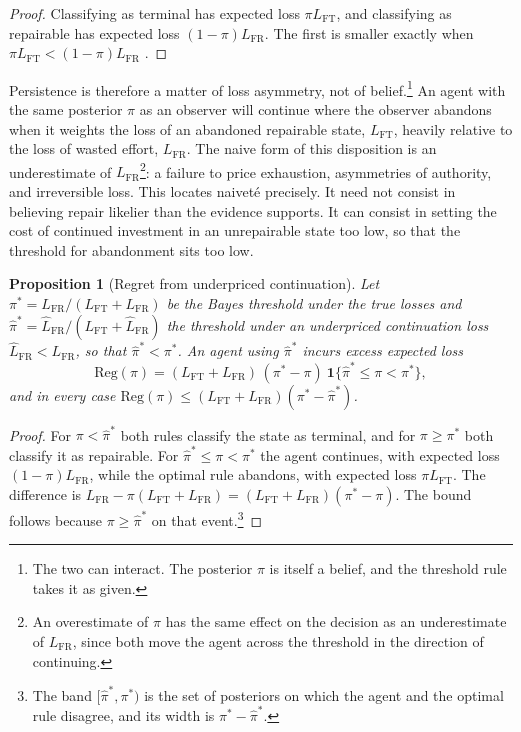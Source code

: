 \documentclass[11pt]{article}
\newtheorem{proposition}{Proposition}
\theoremstyle{remark}
\begin{document}
\begin{proof}
Classifying as terminal has expected loss $\pi L_{\mathrm{FT}}$, and classifying as repairable has expected loss $(1-\pi)L_{\mathrm{FR}}$. The first is smaller exactly when $\pi L_{\mathrm{FT}}<(1-\pi)L_{\mathrm{FR}}$ \cite{berger}.
\end{proof}

Persistence is therefore a matter of loss asymmetry, not of belief.\footnote{The two can interact. The posterior $\pi$ is itself a belief, and the threshold rule takes it as given.} An agent with the same posterior $\pi$ as an observer will continue where the observer abandons when it weights the loss of an abandoned repairable state, $L_{\mathrm{FT}}$, heavily relative to the loss of wasted effort, $L_{\mathrm{FR}}$. The naive form of this disposition is an underestimate of $L_{\mathrm{FR}}$\footnote{An overestimate of $\pi$ has the same effect on the decision as an underestimate of $L_{\mathrm{FR}}$, since both move the agent across the threshold in the direction of continuing.}: a failure to price exhaustion, asymmetries of authority, and irreversible loss. This locates naivet\'e precisely. It need not consist in believing repair likelier than the evidence supports. It can consist in setting the cost of continued investment in an unrepairable state too low, so that the threshold for abandonment sits too low.

\begin{proposition}[Regret from underpriced continuation]
Let $\pi^\ast=L_{\mathrm{FR}}/(L_{\mathrm{FT}}+L_{\mathrm{FR}})$ be the Bayes threshold under the true losses and $\hat\pi^\ast=\hat L_{\mathrm{FR}}/(L_{\mathrm{FT}}+\hat L_{\mathrm{FR}})$ the threshold under an underpriced continuation loss $\hat L_{\mathrm{FR}}<L_{\mathrm{FR}}$, so that $\hat\pi^\ast<\pi^\ast$. An agent using $\hat\pi^\ast$ incurs excess expected loss
\[
\mathrm{Reg}(\pi)=(L_{\mathrm{FT}}+L_{\mathrm{FR}})\,(\pi^\ast-\pi)\ \mathbf 1\{\hat\pi^\ast\le\pi<\pi^\ast\},
\]
and in every case $\mathrm{Reg}(\pi)\le(L_{\mathrm{FT}}+L_{\mathrm{FR}})(\pi^\ast-\hat\pi^\ast)$.
\end{proposition}

\begin{proof}
For $\pi<\hat\pi^\ast$ both rules classify the state as terminal, and for $\pi\ge\pi^\ast$ both classify it as repairable. For $\hat\pi^\ast\le\pi<\pi^\ast$ the agent continues, with expected loss $(1-\pi)L_{\mathrm{FR}}$, while the optimal rule abandons, with expected loss $\pi L_{\mathrm{FT}}$. The difference is $L_{\mathrm{FR}}-\pi(L_{\mathrm{FT}}+L_{\mathrm{FR}})=(L_{\mathrm{FT}}+L_{\mathrm{FR}})(\pi^\ast-\pi)$. The bound follows because $\pi\ge\hat\pi^\ast$ on that event.\footnote{The band $[\hat\pi^\ast,\pi^\ast)$ is the set of posteriors on which the agent and the optimal rule disagree, and its width is $\pi^\ast-\hat\pi^\ast$.}
\end{proof}
\end{document}
